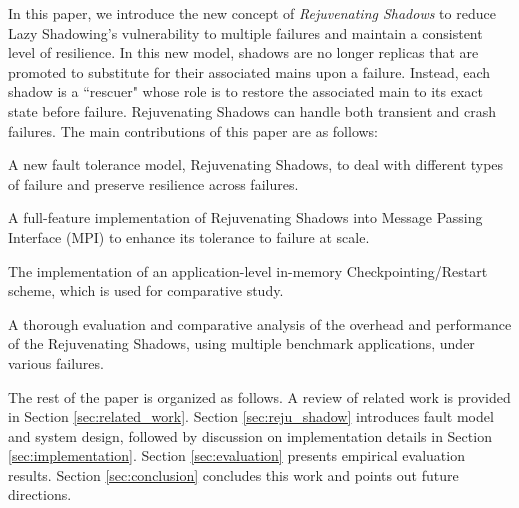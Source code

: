 In this paper, we introduce the new concept of {\it Rejuvenating Shadows} to reduce Lazy Shadowing's vulnerability to multiple failures and maintain a consistent level of resilience. In this new model, shadows are no longer replicas that are promoted to substitute for their associated mains upon a failure. Instead, each shadow is a ``rescuer" whose role is to restore the associated main to its exact state before failure. Rejuvenating Shadows can handle both transient and crash failures. The main contributions of this paper are as follows:


\begin{itemize}
{
   \item A new fault tolerance model, Rejuvenating Shadows, to deal with different types of failure and preserve resilience across failures.
   \item A full-feature implementation of Rejuvenating Shadows into Message Passing Interface (MPI) to enhance its tolerance to failure at scale.
   \item The implementation of an application-level in-memory Checkpointing/Restart scheme, which is used for comparative study.
   \item A thorough evaluation and comparative analysis of the overhead and performance of the Rejuvenating Shadows, using multiple benchmark applications, under various failures.
}
\end{itemize}

The rest of the paper is organized as follows. A review of related work is provided in Section 
\ref{sec:related_work}. Section \ref{sec:reju_shadow} introduces fault model and system design, followed by discussion on implementation details in Section \ref{sec:implementation}.
Section \ref{sec:evaluation} presents empirical evaluation results. Section \ref{sec:conclusion} concludes this work and points out future directions.



